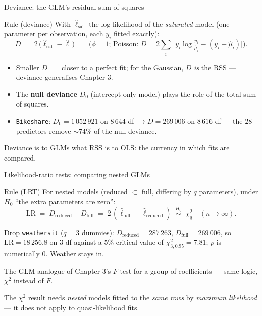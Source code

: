 \documentclass[aspectratio=169,11pt]{beamer}
\begin{document}
\begin{frame}{Deviance: the GLM's residual sum of squares}
  \footnotesize
  \begin{block}{Rule (deviance)}
    \footnotesize
    With $\hat\ell_{\text{sat}}$ the log-likelihood of the \emph{saturated} model
    (one parameter per observation, each $y_i$ fitted exactly):
    \[
      D \;=\; 2\,\big(\hat\ell_{\text{sat}} - \hat\ell\,\big)
      \qquad\text{(}\phi = 1\text{; Poisson: } D = 2\textstyle\sum_i\big[\,y_i\log\tfrac{y_i}{\hat\mu_i} - (y_i-\hat\mu_i)\big]\text{)}.
    \]
  \end{block}
  \begin{readme}
    \begin{itemize}
      \item Smaller $D$ $=$ closer to a perfect fit; for the Gaussian, $D$ \emph{is}
            the RSS --- deviance generalises Chapter 3.
      \item The \textbf{null deviance} $D_0$ (intercept-only model) plays the role of
            the total sum of squares.
      \item \texttt{Bikeshare}: $D_0 = 1\,052\,921$ on $8\,644$ df
            $\to D = 269\,006$ on $8\,616$ df --- the $28$ predictors remove
            $\sim\!74\%$ of the null deviance.
    \end{itemize}
  \end{readme}
  \begin{takeaway}
    Deviance is to GLMs what RSS is to OLS: the currency in which fits are compared.
  \end{takeaway}
\end{frame}

\begin{frame}{Likelihood-ratio tests: comparing nested GLMs}
  \footnotesize
  \begin{block}{Rule (LRT)}
    \footnotesize
    For nested models (reduced $\subset$ full, differing by $q$ parameters), under
    $H_0$ ``the extra parameters are zero'':
    \[
      \text{LR} \;=\; D_{\text{reduced}} - D_{\text{full}}
      \;=\; 2\,(\hat\ell_{\text{full}} - \hat\ell_{\text{reduced}})
      \;\;\overset{H_0}{\sim}\;\; \chi^2_{q} \quad (n\to\infty).
    \]
  \end{block}
  \begin{numexample}
    Drop \texttt{weathersit} ($q = 3$ dummies):
    $D_{\text{reduced}} = 287\,263$, $D_{\text{full}} = 269\,006$, so
    $\text{LR} = 18\,256.8$ on $3$ df against a $5\%$ critical value of
    $\chi^2_{3,0.95} = 7.81$; $p$ is numerically $0$. Weather stays in.
  \end{numexample}
  \begin{takeaway}
    The GLM analogue of Chapter 3's $F$-test for a group of coefficients --- same
    logic, $\chi^2$ instead of $F$.
  \end{takeaway}
  \begin{mistake}
    The $\chi^2$ result needs \emph{nested} models fitted to the \emph{same rows} by
    \emph{maximum likelihood} --- it does not apply to quasi-likelihood fits.
  \end{mistake}
\end{frame}
\end{document}

